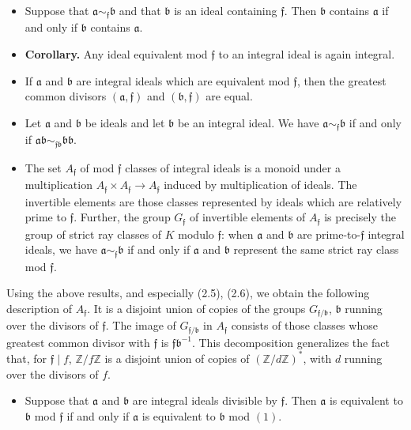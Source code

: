 \documentclass[12pt,a4paper]{article}
\theoremstyle{plain}
\theoremstyle{definition}
\newcommand{\ff}{\mathfrak{f}}
\newcommand{\Z}{\mathbb{Z}}
\begin{document}
\begin{itemize}[leftmargin=2em]
\item[(2.2)] Suppose that $\mathfrak{a}\sim_{\ff}\mathfrak{b}$ and that $\mathfrak{b}$ is an ideal containing $\ff$. Then $\mathfrak{b}$ contains $\mathfrak{a}$ if and only if $\mathfrak{b}$ contains $\mathfrak{a}$.
\item[(2.3)] \textbf{Corollary.} Any ideal equivalent mod $\ff$ to an integral ideal is again integral.
\item[(2.4)] If $\mathfrak{a}$ and $\mathfrak{b}$ are integral ideals which are equivalent mod $\ff$, then the greatest common divisors $(\mathfrak{a},\ff)$ and $(\mathfrak{b},\ff)$ are equal.
\item[(2.5)] Let $\mathfrak{a}$ and $\mathfrak{b}$ be ideals and let $\mathfrak{b}$ be an integral ideal. We have $\mathfrak{a}\sim_{\ff}\mathfrak{b}$ if and only if $\mathfrak{a}\mathfrak{b}\sim_{\ff\mathfrak{b}}\mathfrak{b}\mathfrak{b}$.
\item[(2.6)] The set $A_{\ff}$ of mod $\ff$ classes of integral ideals is a monoid under a multiplication $A_{\ff}\times A_{\ff}\to A_{\ff}$ induced by multiplication of ideals. The invertible elements are those classes represented by ideals which are relatively prime to $\ff$. Further, the group $G_{\ff}$ of invertible elements of $A_{\ff}$ is precisely the group of strict ray classes of $K$ modulo $\ff$: when $\mathfrak{a}$ and $\mathfrak{b}$ are prime-to-$\ff$ integral ideals, we have $\mathfrak{a}\sim_{\ff}\mathfrak{b}$ if and only if $\mathfrak{a}$ and $\mathfrak{b}$ represent the same strict ray class mod $\ff$.
\end{itemize}

Using the above results, and especially (2.5), (2.6), we obtain the following description of $A_{\ff}$. It is a disjoint union of copies of the groups $G_{\ff/\mathfrak{b}}$, $\mathfrak{b}$ running over the divisors of $\ff$. The image of $G_{\ff/\mathfrak{b}}$ in $A_{\ff}$ consists of those classes whose greatest common divisor with $\ff$ is $\ff\mathfrak{b}^{-1}$. This decomposition generalizes the fact that, for $\ff\mid f$, $\Z/f\Z$ is a disjoint union of copies of $(\Z/d\Z)^*$, with $d$ running over the divisors of $f$.

\begin{itemize}[leftmargin=2em]
\item[(2.7)] Suppose that $\mathfrak{a}$ and $\mathfrak{b}$ are integral ideals divisible by $\ff$. Then $\mathfrak{a}$ is equivalent to $\mathfrak{b}$ mod $\ff$ if and only if $\mathfrak{a}$ is equivalent to $\mathfrak{b}$ mod $(1)$.
\end{itemize}
\end{document}
